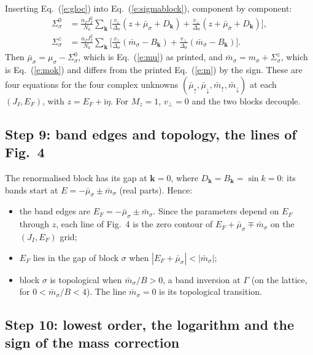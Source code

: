 \documentclass[11pt,a4paper]{article}
\newcommand{\up}{{\uparrow}}
\newcommand{\dn}{{\downarrow}}
\newcommand{\I}{\mathrm{i}}
\begin{document}
Inserting Eq.~(\ref{e:gloc}) into Eq.~(\ref{e:sigmablock}), component by component:
\begin{align}
\Sigma^0_\sigma&=\frac{n_IJ_I^2}{N_k}\sum_{\bm k}\Big[\frac{v_z}{\Delta_\sigma}(z+\bar\mu_\sigma+D_{\bm k})
 +\frac{v_\perp}{\Delta_{\bar\sigma}}(z+\bar\mu_{\bar\sigma}+D_{\bm k})\Big],\\
\Sigma^z_\sigma&=\frac{n_IJ_I^2}{N_k}\sum_{\bm k}\Big[\frac{v_z}{\Delta_\sigma}(\bar m_\sigma-B_{\bm k})
 +\frac{v_\perp}{\Delta_{\bar\sigma}}(\bar m_{\bar\sigma}-B_{\bm k})\Big].
\end{align}
Then $\bar\mu_\sigma=\mu_\sigma-\Sigma^0_\sigma$, which is Eq.~(\ref{e:mu}) as printed, and
$\bar m_\sigma=m_\sigma+\Sigma^z_\sigma$, which is Eq.~(\ref{e:mok}) and differs from the printed Eq.~(\ref{e:m}) by the
sign. These are four equations for the four complex unknowns $(\bar\mu_\up,\bar\mu_\dn,\bar m_\up,\bar m_\dn)$
at each $(J_I,E_F)$, with $z=E_F+\I\eta$. For $M_z=1$, $v_\perp=0$ and the two blocks decouple.

\subsection{Step 9: band edges and topology, the lines of Fig.~4}\label{st:lines}

The renormalised block has its gap at $\bm k=0$, where $D_{\bm k}=B_{\bm k}=\sin k=0$: its bands start at
$E=-\bar\mu_\sigma\pm\bar m_\sigma$ (real parts). Hence:
\begin{itemize}
\item the band edges are $E_F=-\bar\mu_\sigma\pm\bar m_\sigma$. Since the parameters depend on $E_F$
  through $z$, each line of Fig.~4 is the zero contour of $E_F+\bar\mu_\sigma\mp\bar m_\sigma$ on the
  $(J_I,E_F)$ grid;
\item $E_F$ lies in the gap of block $\sigma$ when $|E_F+\bar\mu_\sigma|<|\bar m_\sigma|$;
\item block $\sigma$ is topological when $\bar m_\sigma/B>0$, a band inversion at $\Gamma$ (on the lattice,
  for $0<\bar m_\sigma/B<4$). The line $\bar m_\sigma=0$ is its topological transition.
\end{itemize}

\subsection{Step 10: lowest order, the logarithm and the sign of the mass correction}\label{st:log}
\end{document}
